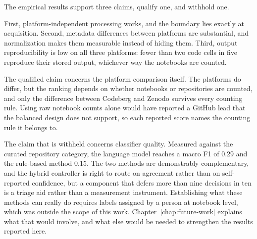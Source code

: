 The empirical results support three claims, qualify one, and withhold one.

First, platform-independent processing works, and the boundary lies exactly at acquisition. Second, metadata differences between platforms are substantial, and normalization makes them measurable instead of hiding them. Third, output reproducibility is low on all three platforms: fewer than two code cells in five reproduce their stored output, whichever way the notebooks are counted.

The qualified claim concerns the platform comparison itself. The platforms do differ, but the ranking depends on whether notebooks or repositories are counted, and only the difference between Codeberg and Zenodo survives every counting rule. Using raw notebook counts alone would have reported a GitHub lead that the balanced design does not support, so each reported score names the counting rule it belongs to.

The claim that is withheld concerns classifier quality. Measured against the curated repository category, the language model reaches a macro F1 of 0.29 and the rule-based method 0.15. The two methods are demonstrably complementary, and the hybrid controller is right to route on agreement rather than on self-reported confidence, but a component that defers more than nine decisions in ten is a triage aid rather than a measurement instrument. Establishing what these methods can really do requires labels assigned by a person at notebook level, which was outside the scope of this work. Chapter~\ref{chap:future-work} explains what that would involve, and what else would be needed to strengthen the results reported here.
